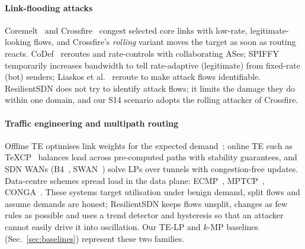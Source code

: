 
\paragraph{Link-flooding attacks}
Coremelt~\cite{studer2009coremelt} and Crossfire~\cite{kang2013crossfire} congest selected core
links with low-rate, legitimate-looking flows, and Crossfire's \emph{rolling} variant moves the
target as soon as routing reacts. CoDef~\cite{lee2013codef} reroutes and rate-controls with
collaborating ASes; SPIFFY~\cite{kang2016spiffy} temporarily increases bandwidth to tell
rate-adaptive (legitimate) from fixed-rate (bot) senders; Liaskos et al.~\cite{liaskos2016novel}
reroute to make attack flows identifiable. ResilientSDN does not try to identify attack flows; it
limits the damage they do within one domain, and our S14 scenario adopts the rolling attacker of
Crossfire.

\paragraph{Traffic engineering and multipath routing}
Offline TE optimises link weights for the expected demand~\cite{fortz2000ospf}; online TE such as
TeXCP~\cite{kandula2005texcp} balances load across pre-computed paths with stability guarantees, and
SDN WANs (B4~\cite{jain2013b4}, SWAN~\cite{hong2013swan}) solve LPs over tunnels with
congestion-free updates. Data-centre schemes spread load in the data plane: ECMP~\cite{rfc2992},
MPTCP~\cite{raiciu2011mptcp}, CONGA~\cite{alizadeh2014conga}. These systems target utilisation
under benign demand, split flows and assume demands are honest; ResilientSDN keeps flows
unsplit, changes as few rules as possible and uses a trend detector and hysteresis so that an
attacker cannot easily drive it into oscillation. Our TE-LP and $k$-MP baselines
(Sec.~\ref{sec:baselines}) represent these two families.

